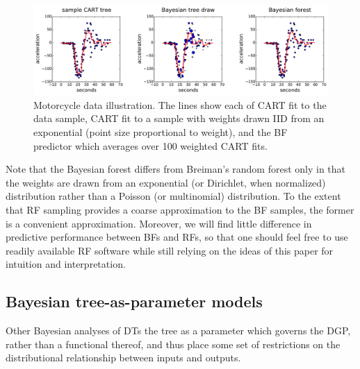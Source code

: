 \documentclass{article}
\begin{document}
\begin{figure}
\includegraphics[width=\textwidth]{../graphs/mcycle}   
\caption{\label{mcycle} Motorcycle data illustration.  The lines show each of CART fit to the data sample, CART fit to a sample with weights drawn IID from an exponential (point size proportional to weight), and the BF predictor which averages over 100 weighted CART fits.} 
\end{figure}    

Note that the Bayesian forest differs from Breiman's random
forest only in that the weights are drawn from an exponential (or Dirichlet, when normalized) distribution
rather than a Poisson (or multinomial) distribution. To the extent that RF sampling
provides a coarse approximation to the BF samples, the former is a
convenient approximation.  Moreover, we will find little difference in predictive performance between BFs and RFs, so that one should feel free to use readily available RF software while still relying on the ideas of this paper for intuition and interpretation.


    \subsection{Bayesian tree-as-parameter
models}\label{bayesian-tree-as-parameter-models}



Other Bayesian analyses of DTs the tree as
a parameter which governs the DGP, rather than a functional thereof, and thus
place some set of restrictions on the distributional relationship between
inputs and outputs.   
\end{document}
